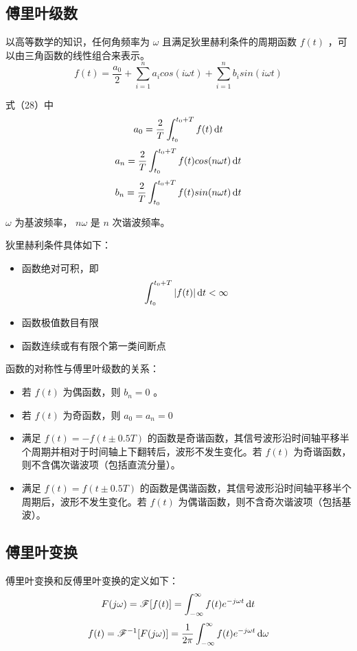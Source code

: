 \documentclass[UTF8,a4paper,11pt]{article}
\begin{document}
\subsection{傅里叶级数}
以高等数学的知识，任何角频率为 $\omega$ 且满足狄里赫利条件的周期函数 $f(t)$ ，可以由三角函数的线性组合来表示。
\begin{equation}
f(t)=\frac{a_0}{2}+\sum_{i=1}^n a_icos(i\omega t)+\sum_{i=1}^n b_isin(i\omega t)
\end{equation}

式（28）中
\begin{equation}
a_0=\frac{2}{T}\int_{t_0}^{t_0+T} {f(t)} \,{\rm d}t
\end{equation}
\begin{equation}
a_n=\frac{2}{T}\int_{t_0}^{t_0+T} {f(t)cos(n\omega t)} \,{\rm d}t
\end{equation}
\begin{equation}
b_n=\frac{2}{T}\int_{t_0}^{t_0+T} {f(t)sin(n\omega t)} \,{\rm d}t
\end{equation}

$\omega$ 为基波频率， $n\omega$ 是 $n$ 次谐波频率。

狄里赫利条件具体如下：
\begin{itemize}
\item 函数绝对可积，即
\begin{equation}
\int_{t_0}^{t_0+T} {\left | f(t) \right |} \,{\rm d}t<\infty
\end{equation}
\item 函数极值数目有限
\item 函数连续或有有限个第一类间断点
\end{itemize} 

函数的对称性与傅里叶级数的关系：
\begin{itemize}
\item 若 $f(t)$ 为偶函数，则 $b_n=0$ 。
\item 若 $f(t)$ 为奇函数，则 $a_0=a_n=0$
\item 满足 $f(t)=-f(t\pm 0.5T)$ 的函数是奇谐函数，其信号波形沿时间轴平移半个周期并相对于时间轴上下翻转后，波形不发生变化。若 $f(t)$ 为奇谐函数，则不含偶次谐波项（包括直流分量）。
\item 满足 $f(t)=f(t\pm 0.5T)$ 的函数是偶谐函数，其信号波形沿时间轴平移半个周期后，波形不发生变化。若 $f(t)$ 为偶谐函数，则不含奇次谐波项（包括基波）。
\end{itemize} 

\subsection{傅里叶变换}
傅里叶变换和反傅里叶变换的定义如下：
\begin{equation}
F(j\omega)=\mathscr{F}[f(t)]=\int_{-\infty}^{\infty} {f(t)e^{-j\omega t}} \,{\rm d}t
\end{equation}
\begin{equation}
f(t)=\mathscr{F}^{-1}[F(j\omega)]=\frac{1}{2\pi}\int_{-\infty}^{\infty} {f(t)e^{-j\omega t}} \,{\rm d}\omega
\end{equation}
\end{document}
